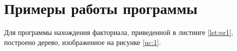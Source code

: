 \section{Примеры работы программы}
Для программы нахождения факториала, приведенной в листинге \ref{lst:pr1}, построено дерево, изображенное на рисунке  \ref{uc:1}.

\begin{figure}[H]
	\end{figure}

